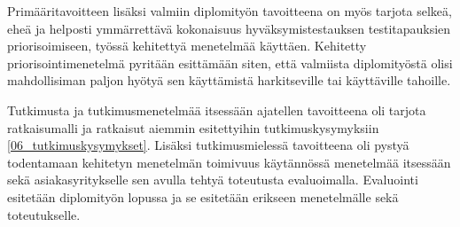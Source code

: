 Primääritavoitteen lisäksi valmiin diplomityön tavoitteena on myös tarjota selkeä, eheä ja helposti ymmärrettävä kokonaisuus hyväksymistestauksen testitapauksien priorisoimiseen, työssä kehitettyä menetelmää käyttäen.
Kehitetty priorisointimenetelmä pyritään esittämään siten, että valmiista diplomityöstä olisi mahdollisiman paljon hyötyä sen käyttämistä harkitseville tai käyttäville tahoille.

Tutkimusta ja tutkimusmenetelmää itsessään ajatellen tavoitteena oli tarjota ratkaisumalli ja ratkaisut aiemmin esitettyihin tutkimuskysymyksiin \ref{06_tutkimuskysymykset}.
Lisäksi tutkimusmielessä tavoitteena oli pystyä todentamaan kehitetyn menetelmän toimivuus käytännössä menetelmää itsessään sekä asiakasyritykselle sen avulla tehtyä toteutusta evaluoimalla.
Evaluointi esitetään diplomityön lopussa ja se esitetään erikseen menetelmälle sekä toteutukselle.
